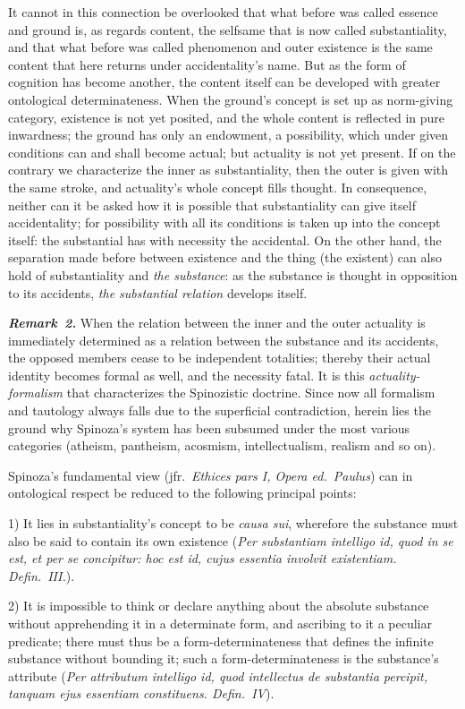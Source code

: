 \documentclass[12pt]{book}
\newcommand{\anm}[1]{\emph{\textbf{Remark~#1.}}}
\begin{document}
It cannot in this connection be overlooked that what before was called
essence and ground is, as regards content, the selfsame that is now called
substantiality, and that what before was called phenomenon and outer
existence is the same content that here returns under accidentality's name.
But as the form of cognition has become another, the content itself can be
developed with greater ontological determinateness. When the ground's
concept is set up as norm-giving category, existence is not yet posited, and
the whole content is reflected in pure inwardness; the ground has only an
endowment, a possibility, which under given conditions can and shall become
actual; but actuality is not yet present. If on the contrary we characterize
the inner as substantiality, then the outer is given with the same stroke,
and actuality's whole concept fills thought. In consequence, neither can it
be asked how it is possible that substantiality can give itself
accidentality; for possibility with all its conditions is taken up into the
concept itself: the substantial has with necessity the accidental. On the
other hand, the separation made before between existence and the thing (the
existent) can also hold of substantiality and \emph{the substance}: as the
substance is thought in opposition to its accidents, \emph{the substantial
relation} develops itself.

\anm{2} When the relation between the inner and the outer actuality is
immediately determined as a relation between the substance and its
accidents, the opposed members cease to be independent totalities; thereby
their actual identity becomes formal as well, and the necessity fatal. It is
this \emph{actuality-formalism} that characterizes the Spinozistic doctrine.
Since now all formalism and tautology always falls due to the superficial
contradiction, herein lies the ground why Spinoza's system has been subsumed
under the most various categories (atheism, pantheism, acosmism,
intellectualism, realism and so on).

Spinoza's fundamental view (jfr.\ \textit{Ethices pars I, Opera ed.\
Paulus}) can in ontological respect be reduced to the following principal
points:

1) It lies in substantiality's concept to be \textit{causa sui}, wherefore
the substance must also be said to contain its own existence (\textit{Per
substantiam intelligo id, quod in se est, et per se concipitur: hoc est id,
cujus essentia involvit existentiam. Defin.\ III.}).

2) It is impossible to think or declare anything about the absolute
substance without apprehending it in a determinate form, and ascribing to it
a peculiar predicate; there must thus be a form-determinateness that defines
the infinite substance without bounding it; such a form-determinateness is
the substance's attribute (\textit{Per attributum intelligo id, quod
intellectus de substantia percipit, tanquam ejus essentiam constituens.
Defin.\ IV}).
\end{document}
